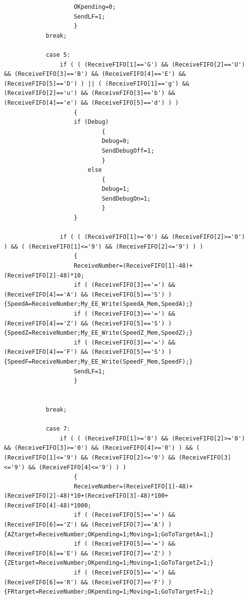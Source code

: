 \documentclass[
  a4paper,
  twoside,
  titlepage,
  12pt]{article}
\numberwithin{equation}{section}
\numberwithin{figure}{section}
\numberwithin{table}{section}
\begin{document}
\begin{verbatim}
                    OKpending=0;
                    SendLF=1;
                    }
            break;

            case 5:
                if ( ( (ReceiveFIFO[1]=='G') && (ReceiveFIFO[2]=='U') && (ReceiveFIFO[3]=='B') && (ReceiveFIFO[4]=='E') && (ReceiveFIFO[5]=='D') ) || ( (ReceiveFIFO[1]=='g') && (ReceiveFIFO[2]=='u') && (ReceiveFIFO[3]=='b') && (ReceiveFIFO[4]=='e') && (ReceiveFIFO[5]=='d') ) ) 
                    {
                    if (Debug)
                            {
                            Debug=0;
                            SendDebugOff=1;
                            }
                        else
                            {
                            Debug=1;
                            SendDebugOn=1;
                            }
                    }

                if ( ( (ReceiveFIFO[1]>='0') && (ReceiveFIFO[2]>='0') ) && ( (ReceiveFIFO[1]<='9') && (ReceiveFIFO[2]<='9') ) )
                    {
                    ReceiveNumber=(ReceiveFIFO[1]-48)+(ReceiveFIFO[2]-48)*10;
                    if ( (ReceiveFIFO[3]=='=') && (ReceiveFIFO[4]=='A') && (ReceiveFIFO[5]=='S') ) {SpeedA=ReceiveNumber;My_EE_Write(SpeedA_Mem,SpeedA);}
                    if ( (ReceiveFIFO[3]=='=') && (ReceiveFIFO[4]=='Z') && (ReceiveFIFO[5]=='S') ) {SpeedZ=ReceiveNumber;My_EE_Write(SpeedZ_Mem,SpeedZ);}
                    if ( (ReceiveFIFO[3]=='=') && (ReceiveFIFO[4]=='F') && (ReceiveFIFO[5]=='S') ) {SpeedF=ReceiveNumber;My_EE_Write(SpeedF_Mem,SpeedF);}
                    SendLF=1;
                    }


            break;

            case 7:
                if ( ( (ReceiveFIFO[1]>='0') && (ReceiveFIFO[2]>='0') && (ReceiveFIFO[3]>='0') && (ReceiveFIFO[4]>='0') ) && ( (ReceiveFIFO[1]<='9') && (ReceiveFIFO[2]<='9') && (ReceiveFIFO[3]<='9') && (ReceiveFIFO[4]<='9') ) )
                    {
                    ReceiveNumber=(ReceiveFIFO[1]-48)+(ReceiveFIFO[2]-48)*10+(ReceiveFIFO[3]-48)*100+(ReceiveFIFO[4]-48)*1000;
                    if ( (ReceiveFIFO[5]=='=') && (ReceiveFIFO[6]=='Z') && (ReceiveFIFO[7]=='A') ) {AZtarget=ReceiveNumber;OKpending=1;Moving=1;GoToTargetA=1;}
                    if ( (ReceiveFIFO[5]=='=') && (ReceiveFIFO[6]=='E') && (ReceiveFIFO[7]=='Z') ) {ZEtarget=ReceiveNumber;OKpending=1;Moving=1;GoToTargetZ=1;}
                    if ( (ReceiveFIFO[5]=='=') && (ReceiveFIFO[6]=='R') && (ReceiveFIFO[7]=='F') ) {FRtarget=ReceiveNumber;OKpending=1;Moving=1;GoToTargetF=1;}


\end{verbatim}
\end{document}
